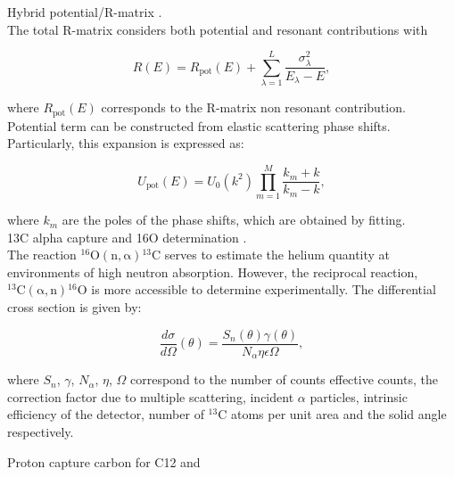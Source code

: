 \documentclass[openany]{book}
\begin{document}
 Hybrid potential/R-matrix \cite{sparenberg_2005}. \\

The total R-matrix considers both potential and resonant contributions with 

 \begin{equation}\label{eq:rmatrix_potentialResonant}
 	R(E) = 	R_{\mathrm{pot}}(E) + \sum_{\lambda = 1}^{L} \frac{\sigma^2_\lambda}{E_\lambda - E},
 \end{equation}

where $R_{\mathrm{pot}}(E)$ corresponds to the R-matrix non resonant contribution. \\

Potential term can be constructed from elastic scattering phase shifts. Particularly, this expansion is expressed as:

 \begin{equation}\label{eq:rmatrix_potentialResonant_potential}
	U_\mathrm{pot}(E) = U_0(k^2) \prod_{m=1}^{M} \frac{k_m + k}{k_m - k},
\end{equation}

where $k_m$ are the poles of the phase shifts, which are obtained by fitting.\\ 

 13C alpha capture and 16O determination \cite{prusachenko_bobrovsky_bondarenko_bokhovko_gurbich_ketlerov_2022}. \\
 
 The reaction $\mathrm{{}^{16}O(n, \alpha){}^{13}C }$ serves to estimate the helium quantity at environments of high neutron absorption. However, the reciprocal reaction,  $\mathrm{{}^{13}C(\alpha, n){}^{16}O }$ is more accessible to determine experimentally. The differential cross section is given by: 
 
 \begin{equation}\label{eq:rmatrix_differentialCrossSection_experimental}
 	\frac{d\sigma}{d\Omega}(\theta) = \frac{S_n(\theta)\gamma(\theta)}{N_\alpha \eta \epsilon \Omega},
 \end{equation}

where $S_n$, $\gamma$, $N_\alpha$, $\eta$, $\Omega$ correspond to the number of counts effective counts, the correction factor due to multiple scattering, incident $\alpha$ particles, intrinsic efficiency of the detector, number of $\mathrm{{}^{13}C}$ atoms per unit area and the solid angle respectively.

Proton capture carbon \cite{burtebaev_igamov_peterson_yarmukhamedov_zazulin_2008} for C12 and\\
\end{document}
